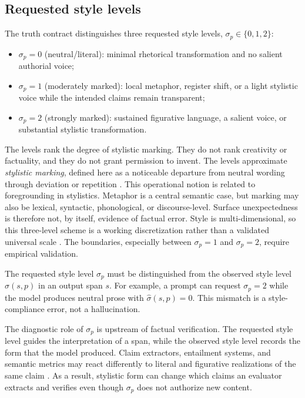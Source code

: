 \documentclass{clv2025}
\begin{document}
\subsection{Requested style levels}

The truth contract distinguishes three requested style levels, $\sigma_p\in\{0,1,2\}$:
\begin{itemize}
  \item $\sigma_p=0$ (neutral/literal): minimal rhetorical transformation and no salient authorial voice;
  \item $\sigma_p=1$ (moderately marked): local metaphor, register shift, or a light stylistic voice while the intended claims remain transparent;
  \item $\sigma_p=2$ (strongly marked): sustained figurative language, a salient voice, or substantial stylistic transformation.
\end{itemize}
The levels rank the degree of stylistic marking.
They do not rank creativity or factuality, and they do not grant permission to invent.
The levels approximate \emph{stylistic marking}, defined here as a noticeable departure from neutral wording through deviation or repetition \citep{leech_short_style_1981,vanpeer_stylistics_2020}.
This operational notion is related to foregrounding in stylistics.
Metaphor is a central semantic case, but marking may also be lexical, syntactic, phonological, or discourse-level.
Surface unexpectedness is therefore not, by itself, evidence of factual error.
Style is multi-dimensional, so this three-level scheme is a working discretization rather than a validated universal scale \citep{kang_style_2021,jin_deep_2022}.
The boundaries, especially between $\sigma_p=1$ and $\sigma_p=2$, require empirical validation.

The requested style level $\sigma_p$ must be distinguished from the observed style level $\widehat\sigma(s,p)$ in an output span $s$.
For example, a prompt can request $\sigma_p=2$ while the model produces neutral prose with $\widehat\sigma(s,p)=0$.
This mismatch is a style-compliance error, not a hallucination.

The diagnostic role of $\sigma_p$ is upstream of factual verification.
The requested style level guides the interpretation of a span, while the observed style level records the form that the model produced.
Claim extractors, entailment systems, and semantic metrics may react differently to literal and figurative realizations of the same claim \citep{chen_menli_2023,aynetdinov_semscore_2024,lai_multidimensional_2023,pauli_mind_2025}.
As a result, stylistic form can change which claims an evaluator extracts and verifies even though $\sigma_p$ does not authorize new content.
\end{document}
